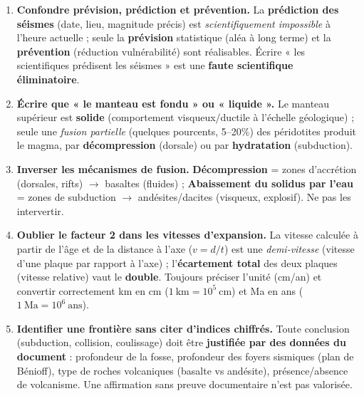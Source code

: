 \documentclass[11pt]{article}
\begin{document}
\begin{attention}
\begin{enumerate}
\item \textbf{Confondre prévision, prédiction et prévention.} La \textbf{prédiction des séismes} (date, lieu, magnitude précis) est \emph{scientifiquement impossible} à l'heure actuelle ; seule la \textbf{prévision} statistique (aléa à long terme) et la \textbf{prévention} (réduction vulnérabilité) sont réalisables. Écrire « les scientifiques prédisent les séismes » est une \textbf{faute scientifique éliminatoire}.
\item \textbf{Écrire que « le manteau est fondu » ou « liquide ».} Le manteau supérieur est \textbf{solide} (comportement visqueux/ductile à l'échelle géologique) ; seule une \emph{fusion partielle} (quelques pourcents, 5--20\%) des péridotites produit le magma, par \textbf{décompression} (dorsale) ou par \textbf{hydratation} (subduction).
\item \textbf{Inverser les mécanismes de fusion.} \textbf{Décompression} = zones d'accrétion (dorsales, rifts) $\rightarrow$ basaltes (fluides) ; \textbf{Abaissement du solidus par l'eau} = zones de subduction $\rightarrow$ andésites/dacites (visqueux, explosif). Ne pas les intervertir.
\item \textbf{Oublier le facteur 2 dans les vitesses d'expansion.} La vitesse calculée à partir de l'âge et de la distance à l'axe ($v = d/t$) est une \emph{demi-vitesse} (vitesse d'une plaque par rapport à l'axe) ; l'\textbf{écartement total} des deux plaques (vitesse relative) vaut le \textbf{double}. Toujours préciser l'unité (\si{cm/an}) et convertir correctement km en cm ($1\ \text{km} = 10^5\ \text{cm}$) et Ma en ans ($1\ \text{Ma} = 10^6\ \text{ans}$).
\item \textbf{Identifier une frontière sans citer d'indices chiffrés.} Toute conclusion (subduction, collision, coulissage) doit être \textbf{justifiée par des données du document} : profondeur de la fosse, profondeur des foyers sismiques (plan de Bénioff), type de roches volcaniques (basalte vs andésite), présence/absence de volcanisme. Une affirmation sans preuve documentaire n'est pas valorisée.
\end{enumerate}
\end{attention}
\end{document}
